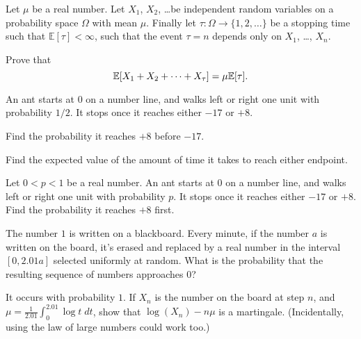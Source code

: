 \begin{problem}
	Let $\mu$ be a real number.
	Let $X_1$, $X_2$, \dots be independent random variables
	on a probability space $\Omega$ with mean $\mu$.
	Finally let $\tau \colon \Omega \to \{1, 2, \dots\}$
	be a stopping time such that $\mathbb E[\tau] < \infty$,
	such that the event $\tau = n$ depends only on $X_1$, \dots, $X_n$.

	Prove that
	\[ \mathbb E[X_1 + X_2 + \dots + X_\tau] = \mu \mathbb E[\tau]. \]
\end{problem}

\begin{problem}
	An ant starts at $0$ on a number line,
	and walks left or right one unit with probability $1/2$.
	It stops once it reaches either $-17$ or $+8$.
	\begin{enumerate}[(a)]
		\ii Find the probability it reaches $+8$ before $-17$.

		\ii Find the expected value of the amount of time
		it takes to reach either endpoint.
	\end{enumerate}
\end{problem}

\begin{problem}
	Let $0 < p < 1$ be a real number.
	An ant starts at $0$ on a number line,
	and walks left or right one unit with probability $p$.
	It stops once it reaches either $-17$ or $+8$.
	Find the probability it reaches $+8$ first.
\end{problem}

\begin{problem}
	The number $1$ is written on a blackboard.
	Every minute, if the number $a$ is written on the board,
	it's erased and replaced by a real number
	in the interval $[0, 2.01a]$ selected uniformly at random.
	What is the probability that the resulting sequence of numbers approaches $0$?
	\begin{hint}
		It occurs with probability $1$.
		If $X_n$ is the number on the board at step $n$,
		and $\mu = \frac{1}{2.01} \int_0^{2.01} \log t \; dt$,
		show that $\log(X_n) - n \mu$ is a martingale.
		(Incidentally, using the law of large numbers could work too.)
	\end{hint}
\end{problem}
